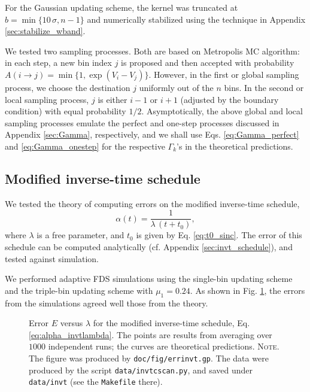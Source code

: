 \documentclass[reprint, floatfix]{revtex4-1}
\newcommand{\note}[1]{{\color{DarkGreen}\footnotesize \textsc{Note.} #1}}
\begin{document}
For the Gaussian updating scheme,
the kernel was truncated at
$b = \min\{10 \, \sigma, n - 1\}$
and numerically stabilized
using the technique
in Appendix \ref{sec:stabilize_wband}.



We tested two sampling processes.
%
Both are based on
Metropolis MC algorithm\cite{
  metropolis1953, newman, frenkel,
  landau_binder}:
%
in each step, a new bin index $j$ is proposed
and then accepted with probability
%
$
A(i \to j) = \min\{ 1, \exp(V_i - V_j) \}.
$
However,
in the first or global sampling process,
we choose the destination $j$
uniformly out of the $n$ bins.
%
In the second or local sampling process,
$j$ is either $i - 1$ or $i + 1$
(adjusted by the boundary condition)
with equal probability $1/2$.
%
Asymptotically,
the above global and local sampling processes
emulate the perfect and one-step processes
discussed in Appendix \ref{sec:Gamma},
respectively,
and we shall use
Eqs. \eqref{eq:Gamma_perfect}
and \eqref{eq:Gamma_onestep}
for the respective $\Gamma_k$'s
in the theoretical predictions.
%



\subsection{\label{sec:results_invt}
Modified inverse-time schedule}


We tested the theory of computing errors
on the modified inverse-time schedule,
%
\begin{equation}
\alpha(t) = \frac{1}{\lambda \, (t + t_0) },
\label{eq:alpha_invtlambda}
\end{equation}
%
where $\lambda$ is a free parameter,
and $t_0$ is given by Eq. \eqref{eq:t0_sinc}.
%
The error of this schedule
can be computed analytically
(cf. Appendix \ref{sec:invt_schedule}),
and tested against simulation.



We performed adaptive FDS simulations
using the single-bin updating scheme
and the triple-bin updating scheme with $\mu_1 = 0.24$.
%
%
As shown in Fig. \ref{fig:errinvt},
the errors from the simulations
agreed well those from the theory.


\begin{figure}[h]
\begin{center}
  \caption{
    \label{fig:errinvt}
    Error $E$ versus $\lambda$
    for the modified inverse-time schedule,
    Eq. \eqref{eq:alpha_invtlambda}.
    The points are results from averaging over $1000$ independent runs;
    the curves are theoretical predictions.
    \note{The figure was produced by \texttt{doc/fig/errinvt.gp}.
      The data were produced by the script \texttt{data/invtcscan.py},
      and saved under \texttt{data/invt}
      (see the \texttt{Makefile} there).
    }%
  }
\end{center}
\end{figure}
\end{document}
